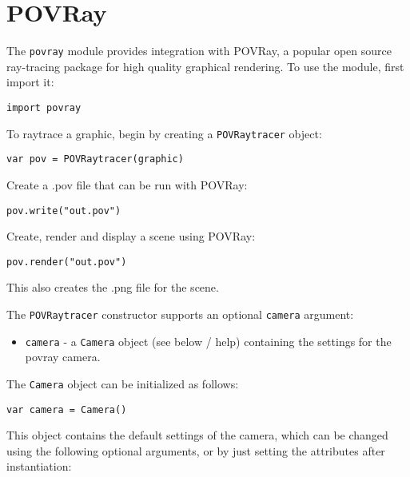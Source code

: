 \hypertarget{povray}{%
\section{POVRay}\label{povray}}

The \texttt{povray} module provides integration with POVRay, a popular
open source ray-tracing package for high quality graphical rendering. To
use the module, first import it:

\begin{lstlisting}
import povray
\end{lstlisting}

To raytrace a graphic, begin by creating a \texttt{POVRaytracer} object:

\begin{lstlisting}
var pov = POVRaytracer(graphic)
\end{lstlisting}

Create a .pov file that can be run with POVRay:

\begin{lstlisting}
pov.write("out.pov")
\end{lstlisting}

Create, render and display a scene using POVRay:

\begin{lstlisting}
pov.render("out.pov")
\end{lstlisting}

This also creates the .png file for the scene.

The \texttt{POVRaytracer} constructor supports an optional
\texttt{camera} argument:

\begin{itemize}

\item
  \texttt{camera} - a \texttt{Camera} object (see below / help)
  containing the settings for the povray camera.
\end{itemize}

The \texttt{Camera} object can be initialized as follows:

\begin{lstlisting}
var camera = Camera()
\end{lstlisting}

This object contains the default settings of the camera, which can be
changed using the following optional arguments, or by just setting the
attributes after instantiation:

